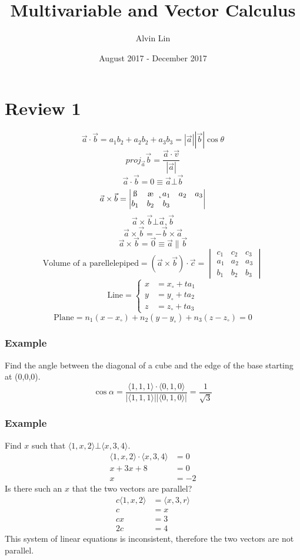 \documentclass[letterpaper, 12pt]{math}
\title{Multivariable and Vector Calculus}
\author{Alvin Lin}
\date{August 2017 - December 2017}
\begin{document}
\maketitle

\section*{Review 1}
\[ \vec{a}\cdot\vec{b} = a_1b_2+a_2b_2+a_3b_3 =
  |\vec{a}||\vec{b}|\cos\theta \]
\[ proj_{\vec{a}}\vec{b} = \frac{\vec{a}\cdot\vec{v}}{|\vec{a}|} \]
\[ \vec{a}\cdot\vec{b} = 0 \equiv \vec{a}\bot\vec{b} \]
\[ \vec{a}\times\vec{b} = \begin{vmatrix}
  \i & \j & \k \\
  a_1 & a_2 & a_3 \\
  b_1 & b_2 & b_3
\end{vmatrix} \]
\[ \vec{a}\times\vec{b}\bot\vec{a},\vec{b} \]
\[ \vec{a}\times\vec{b} = -\vec{b}\times\vec{a} \]
\[ \vec{a}\times\vec{b} = \vec{0} \equiv \vec{a}\parallel\vec{b} \]
\[ \text{Volume of a parellelepiped} = (\vec{a}\times\vec{b})\cdot\vec{c} =
\begin{vmatrix}
  c_1 & c_2 & c_3 \\
  a_1 & a_2 & a_3 \\
  b_1 & b_2 & b_3
\end{vmatrix} \]
\[ \text{Line} = \begin{cases}
  x &= x_{\circ}+ta_1 \\
  y &= y_{\circ}+ta_2 \\
  z &= z_{\circ}+ta_3
\end{cases} \]
\[ \text{Plane} = n_1(x-x_{\circ})+n_2(y-y_{\circ})+n_3(z-z_{\circ}) = 0 \]

\subsubsection*{Example}
Find the angle between the diagonal of a cube and the edge of the base
starting at (0,0,0).
\[ \cos\alpha = \frac{\langle1,1,1\rangle\cdot\langle0,1,0\rangle}
  {|\langle1,1,1\rangle||\langle0,1,0\rangle|} = \frac{1}{\sqrt{3}} \]

\subsubsection*{Example}
Find \( x \) such that \( \langle1,x,2\rangle\bot\langle x,3,4\rangle \).
\begin{align*}
  \langle1,x,2\rangle\cdot\langle x,3,4\rangle &= 0 \\
  x+3x+8 &= 0 \\
  x &= -2
\end{align*}
Is there such an \( x \) that the two vectors are parallel?
\begin{align*}
  c\langle1,x,2\rangle &= \langle x,3,r\rangle \\
  c &= x \\
  cx &= 3 \\
  2c &= 4
\end{align*}
This system of linear equations is inconsistent, therefore the two vectors
are not parallel.
\end{document}
